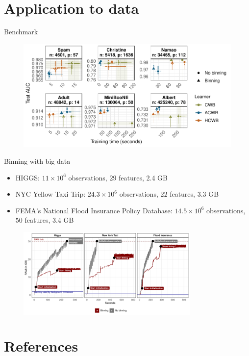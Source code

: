 \documentclass[ignorenonframetext,]{beamer}
\providecommand{\tightlist}{%
  \setlength{\itemsep}{0pt}\setlength{\parskip}{0pt}}
\begin{document}
\hypertarget{application-to-data}{%
\section{Application to data}\label{application-to-data}}

\begin{frame}{Benchmark}
\protect\hypertarget{benchmark}{}
\begin{figure}
\centering
\includegraphics[width=\textwidth]{figures/fig-eq2-2.pdf}
\end{figure}
\end{frame}

\begin{frame}{Binning with big data}
\protect\hypertarget{binning-with-big-data}{}
\begin{itemize}
\tightlist
\item
  HIGGS: \(11 \times 10^6\) observations, \(29\) features, 2.4 GB
\item
  NYC Yellow Taxi Trip: \(24.3 \times 10^6\) observations, \(22\)
  features, 3.3 GB
\item
  FEMA's National Flood Insurance Policy Database: \(14.5 \times 10^6\)
  observations, \(50\) features, 3.4 GB
\end{itemize}

\begin{figure}
\centering
\includegraphics[width=0.8\textwidth]{figures/app-big-data.pdf}
\end{figure}
\end{frame}

\hypertarget{references}{%
\section{References}\label{references}}

\begin{frame}{}
\protect\hypertarget{section}{}
\footnotesize


\end{frame}
\end{document}
